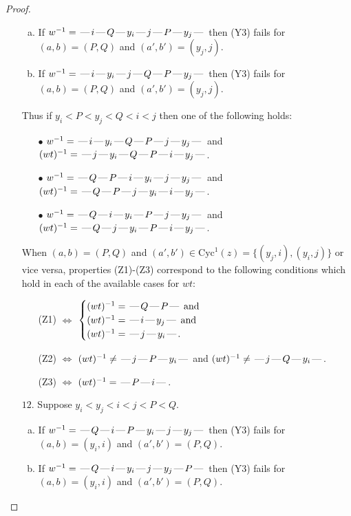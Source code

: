 \documentclass[10pt]{article}
\theoremstyle{definition}
\theoremstyle{definition}
\def\dash{\text{\hspace{0.5mm}---\hspace{0.5mm}}}
\def\Cyc{\mathrm{Cyc}}
\begin{document}
\begin{proof}
\begin{enumerate}
\begin{enumerate}[(a)]
\item If $w^{-1} = \dash i\dash Q\dash y_i\dash j\dash P\dash y_j\dash $ then (Y3) fails for $(a,b)=(P,Q)$ and $(a',b')=(y_j,j)$.
\item If $w^{-1} = \dash i\dash y_i\dash j\dash Q\dash P\dash y_j\dash $ then (Y3) fails for $(a,b)=(P,Q)$ and $(a',b')=(y_j,j)$.
\end{enumerate}
Thus if $y_i < P < y_j < Q < i < j$ then one of the following holds:
\begin{enumerate}
\item[$\bullet$] $w^{-1} = \dash i\dash y_i\dash Q\dash P\dash j\dash y_j\dash $ and $(wt)^{-1} = \dash j\dash y_i\dash Q\dash P\dash i\dash y_j\dash $.
\item[$\bullet$] $w^{-1} = \dash Q\dash P\dash i\dash y_i\dash j\dash y_j\dash $ and $(wt)^{-1} = \dash Q\dash P\dash j\dash y_i\dash i\dash y_j\dash $.
\item[$\bullet$] $w^{-1} = \dash Q\dash i\dash y_i\dash P\dash j\dash y_j\dash $ and $(wt)^{-1} = \dash Q\dash j\dash y_i\dash P\dash i\dash y_j\dash $.
\end{enumerate}
When $(a,b)= (P,Q)$ and $(a',b')\in \Cyc^1(z)=\{(y_j,i),(y_i,j)\}$ or vice versa,
properties (Z1)-(Z3) correspond to the following conditions which
hold in each of the available cases for $wt$:
\begin{enumerate}
\item[](Z1) $\Leftrightarrow$ $\begin{cases}\text{$(wt)^{-1} = \dash Q \dash P \dash$}\text{ and }\\
\text{$(wt)^{-1} = \dash i \dash y_j \dash$}\text{ and }\\
\text{$(wt)^{-1} = \dash j \dash y_i \dash$}.\end{cases}$
\item[](Z2) $\Leftrightarrow$ $(wt)^{-1} \neq \dash j \dash P \dash y_i \dash$ and $(wt)^{-1}\neq \dash j \dash Q \dash y_i \dash$.
\item[](Z3) $\Leftrightarrow$ $(wt)^{-1} = \dash P \dash i \dash$.
\end{enumerate}
\item[$12$.] Suppose $y_i < y_j < i < j < P < Q$.
\begin{enumerate}[(a)]
\item If $w^{-1} = \dash Q\dash i\dash P\dash y_i\dash j\dash y_j\dash $ then (Y3) fails for $(a,b)=(y_i,i)$ and $(a',b')=(P,Q)$.
\item If $w^{-1} = \dash Q\dash i\dash y_i\dash j\dash y_j\dash P\dash $ then (Y3) fails for $(a,b)=(y_i,i)$ and $(a',b')=(P,Q)$.

\end{enumerate}
\end{enumerate}
\end{proof}
\end{document}
